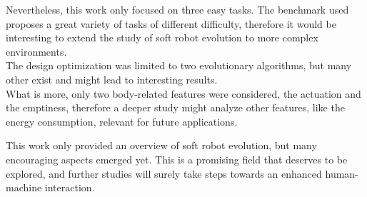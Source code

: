 Nevertheless, this work only focused on three easy tasks. The benchmark used proposes a great variety of tasks of different difficulty, therefore it would be interesting to extend the study of soft robot evolution to more complex environments.\\
The design optimization was limited to two evolutionary algorithms, but many other exist and might lead to interesting results.\\
What is more, only two body-related features were considered, the actuation and the emptiness, therefore a deeper study might analyze other features, like the energy consumption, relevant for future applications.

This work only provided an overview of soft robot evolution, but many encouraging aspects emerged yet. This is a promising field that deserves to be explored, and further studies will surely take steps towards an enhanced human-machine interaction.

\newpage
